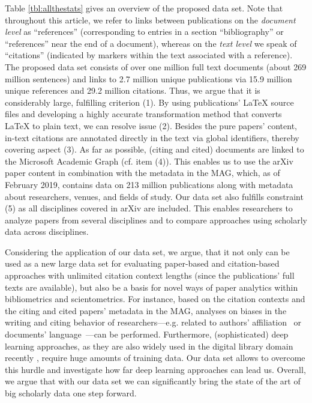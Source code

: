 Table \ref{tbl:allthestats} gives an overview of the proposed data set. Note that throughout this article, we refer to links between publications on the \emph{document level} as ``references'' (corresponding to entries in a section ``bibliography'' or ``references'' near the end of a document), whereas on the \emph{text level} we speak of ``citations'' (indicated by markers within the text associated with a reference). The proposed data set consists of over one million full text documents (about 269 million sentences) and links to 2.7 million unique publications via 15.9 million unique references and 29.2 million citations.
Thus, we argue that it is considerably large, fulfilling criterion (1). By using publications' \LaTeX{} source files and developing a highly accurate transformation method that converts \LaTeX{} to plain text, we can resolve issue (2). Besides the pure papers' content, in-text citations are annotated directly in the text via global identifiers, thereby covering aspect (3). As far as possible, (citing and cited) documents are linked to the Microsoft Academic Graph \cite{Sinha2015MAG} (cf. item (4)). This enables us to use the arXiv paper content in combination with the metadata in the MAG, which, as of February 2019, contains data on 213 million publications along with metadata about researchers, venues, and fields of study. Our data set also fulfills constraint (5) as all disciplines covered in arXiv are included. This enables researchers to analyze papers from several disciplines and to compare approaches using scholarly data across disciplines.

Considering the application of our data set, we argue, that it not only can be used as a new large data set for evaluating paper-based and citation-based approaches with unlimited citation context lengths (since the publications' full texts are available),
but also be a basis for novel ways of paper analytics within bibliometrics and scientometrics. For instance, based on the citation contexts and the citing and cited papers' metadata in the MAG, analyses on biases in the writing and citing behavior of researchers---e.g. related to authors' affiliation~\cite{Reingewertz2018} or documents' language~\cite{Liang2013,Liu2018}---can be performed.
Furthermore, (sophisticated) deep learning approaches, as they are also widely used in the digital library domain recently \cite{Ebensu2017}, require huge amounts of training data. Our data set allows to overcome this hurdle and investigate how far deep learning approaches can lead us.
Overall, we argue that with our data set we can significantly bring the state of the art of big scholarly data one step forward.

